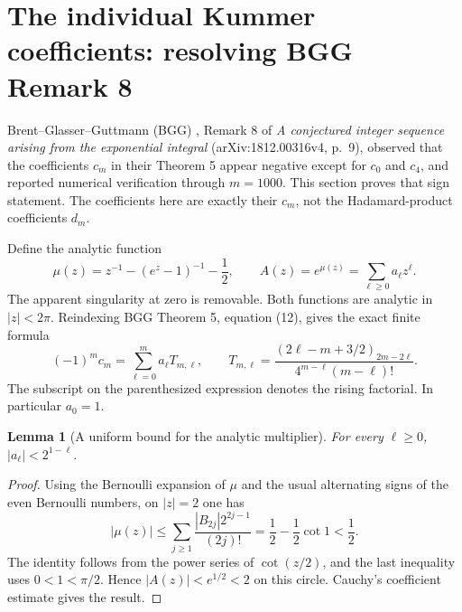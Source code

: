 \documentclass[11pt,a4paper]{article}
\newtheorem{lemma}[theorem]{Lemma}
\theoremstyle{definition}
\theoremstyle{remark}
\numberwithin{equation}{section}
\begin{document}
\section{The individual Kummer coefficients: resolving BGG Remark 8}

Brent--Glasser--Guttmann (BGG) \cite{p1:BrentGlasserGuttmann2019}, Remark 8 of
\emph{A conjectured integer sequence arising from the exponential integral}
(arXiv:1812.00316v4, p.~9), observed that the coefficients $c_m$ in their
Theorem 5 appear negative except for $c_0$ and $c_4$, and reported numerical
verification through $m=1000$. This section proves that sign statement.
The coefficients here are exactly their $c_m$, not the Hadamard-product
coefficients $d_m$.

Define the analytic function
\[
 \mu(z)=z^{-1}-(e^z-1)^{-1}-\frac12,
 \qquad A(z)=e^{\mu(z)}=\sum_{\ell\geq0}a_\ell z^\ell.
\]
The apparent singularity at zero is removable. Both functions are analytic
in $|z|<2\pi$. Reindexing BGG Theorem 5, equation (12), gives the exact
finite formula
\begin{equation}\label{p1:eq:bgg-c-reindexed}
 (-1)^m c_m=\sum_{\ell=0}^m a_\ell T_{m,\ell},\qquad
 T_{m,\ell}=
 \frac{(2\ell-m+3/2)_{2m-2\ell}}{4^{m-\ell}(m-\ell)!}.
\end{equation}
The subscript on the parenthesized expression denotes the rising
factorial. In particular $a_0=1$.

\begin{lemma}[A uniform bound for the analytic multiplier]
For every $\ell\geq0$, $|a_\ell|<2^{1-\ell}$.
\end{lemma}
\begin{proof}
Using the Bernoulli expansion of $\mu$ and the usual alternating signs
of the even Bernoulli numbers, on $|z|=2$ one has
\[
 |\mu(z)|\leq\sum_{j\geq1}\frac{|B_{2j}|2^{2j-1}}{(2j)!}
 =\frac12-\frac12\cot1<\frac12.
\]
The identity follows from the power series of $\cot(z/2)$, and the last
inequality uses $0<1<\pi/2$. Hence $|A(z)|<e^{1/2}<2$ on this circle.
Cauchy's coefficient estimate gives the result.
\end{proof}
\end{document}
